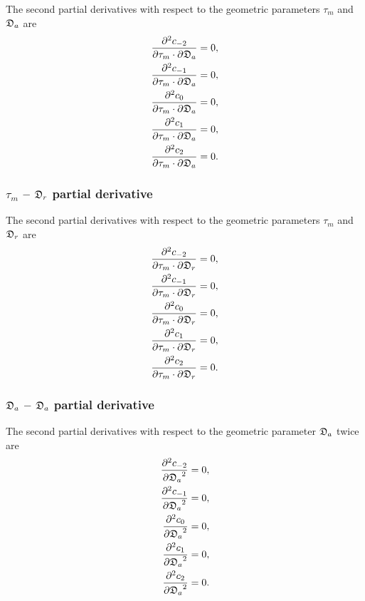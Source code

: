 The second partial derivatives with respect to the geometric parameters $\tau_m$ and $\mathfrak{D}_a$ are
\begin{subequations}
\begin{align}
    \frac{\partial^2 c_{-2}}{\partial \tau_m \cdot \partial \mathfrak{D}_a}  &=  0, \\
    \frac{\partial^2 c_{-1}}{\partial \tau_m \cdot \partial \mathfrak{D}_a} &= 0, \\
    \frac{\partial^2 c_{0}}{\partial \tau_m \cdot \partial \mathfrak{D}_a}  &= 0, \\
    \frac{\partial^2 c_{1}}{\partial \tau_m \cdot \partial \mathfrak{D}_a}  &= 0, \\
    \frac{\partial^2 c_{2}}{\partial \tau_m \cdot \partial \mathfrak{D}_a}  &= 0.
\end{align}
\end{subequations}



\subsubsection{$\tau_m$ -- $\mathfrak{D}_r$ partial derivative}

The second partial derivatives with respect to the geometric parameters $\tau_m$ and $\mathfrak{D}_r$ are
\begin{subequations}
\begin{align}
    \frac{\partial^2 c_{-2}}{\partial \tau_m \cdot \partial \mathfrak{D}_r}  &=  0, \\
    \frac{\partial^2 c_{-1}}{\partial \tau_m \cdot \partial \mathfrak{D}_r} &= 0, \\
    \frac{\partial^2 c_{0}}{\partial \tau_m \cdot \partial \mathfrak{D}_r}  &= 0, \\
    \frac{\partial^2 c_{1}}{\partial \tau_m \cdot \partial \mathfrak{D}_r}  &= 0, \\
    \frac{\partial^2 c_{2}}{\partial \tau_m \cdot \partial \mathfrak{D}_r}  &= 0.
\end{align}
\end{subequations}



\subsubsection{$\mathfrak{D}_a$ -- $\mathfrak{D}_a$ partial derivative}

The second partial derivatives with respect to the geometric parameter $\mathfrak{D}_a$ twice are
\begin{subequations}
\begin{align}
    \frac{\partial^2 c_{-2}}{{\partial \mathfrak{D}_a}^2}  &=  0, \\
    \frac{\partial^2 c_{-1}}{{\partial \mathfrak{D}_a}^2} &= 0, \\
    \frac{\partial^2 c_{0}}{{\partial \mathfrak{D}_a}^2}  &= 0, \\
    \frac{\partial^2 c_{1}}{{\partial \mathfrak{D}_a}^2}  &= 0, \\
    \frac{\partial^2 c_{2}}{{\partial \mathfrak{D}_a}^2}  &= 0.
\end{align}
\end{subequations}



